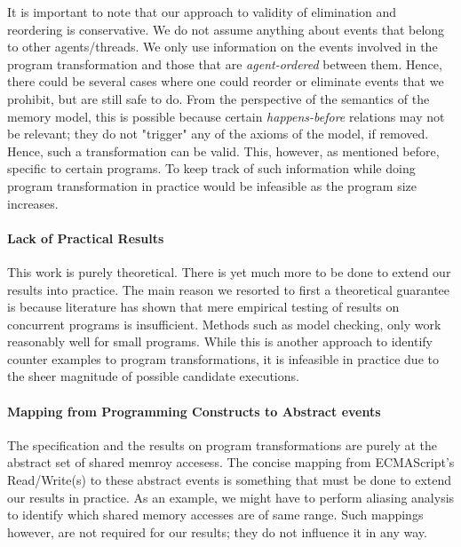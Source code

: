     It is important to note that our approach to validity of elimination and reordering is conservative.
    We do not assume anything about events that belong to other agents/threads. 
    We only use information on the events involved in the program transformation and those that are \textit{agent-ordered} between them.
    Hence, there could be several cases where one could reorder or eliminate events that we prohibit, but are still safe to do. 
    From the perspective of the semantics of the memory model, this is possible because certain \textit{happens-before} relations may not be relevant; they do not "trigger" any of the axioms of the model, if removed. 
    Hence, such a transformation can be valid. 
    This, however, as mentioned before, specific to certain programs. 
    To keep track of such information while doing program transformation in practice would be infeasible as the program size increases.
    
    \paragraph{Lack of Practical Results}

    This work is purely theoretical. 
    There is yet much more to be done to extend our results into practice. 
    The main reason we resorted to first a theoretical guarantee is because literature has shown that mere empirical testing of results on concurrent programs is insufficient. 
    Methods such as model checking, only work reasonably well for small programs. While this is another approach to identify counter examples to program transformations, it is infeasible in practice due to the sheer magnitude of possible candidate executions.

    \paragraph{Mapping from Programming Constructs to Abstract events}

    The specification and the results on program transformations are purely at the abstract set of shared memroy accesess.
    The concise mapping from ECMAScript's Read/Write(s) to these abstract events is something that must be done to extend our results in practice.
    As an example, we might have to perform aliasing analysis to identify which shared memory accesses are of same range. 
    Such mappings however, are not required for our results; they do not influence it in any way.
  
 

   